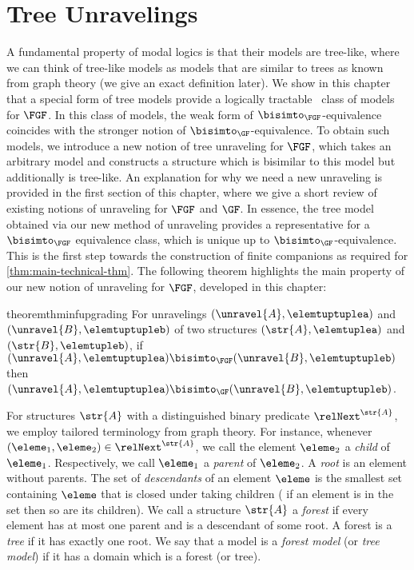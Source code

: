 \chapter{Tree Unravelings}\label{chap:unraveling}
A fundamental property of modal logics is that their models are tree-like, where we can think of tree-like models as models that are similar to trees as known from graph theory (we give an exact definition later).
We show in this chapter that a special form of tree models provide a logically tractable~\cite{otto2013} class of models for $\FGF$.
In this class of models, the weak form of $\bisimto_{\FGF}$-equivalence coincides with the stronger notion of $\bisimto_{\GF}$-equivalence.
To obtain such models, we introduce a new notion of tree unraveling for $\FGF$, which takes an arbitrary model and constructs a structure which is bisimilar to this model but additionally is tree-like.
An explanation for why we need a new unraveling is provided in the first section of this chapter, where we give a short review of existing notions of unraveling for $\FGF$ and $\GF$.
In essence, the tree model obtained via our new method of unraveling provides a representative for a $\bisimto_{\FGF}$ equivalence class, which is unique up to $\bisimto_{\GF}$-equivalence.
This is the first step towards the construction of finite companions as required for \cref{thm:main-technical-thm}.
The following theorem highlights the main property of our new notion of unraveling for $\FGF$, developed in this chapter:
\begin{restatable*}{theorem}{thminfupgrading}\label{thm:inf-bisim-upgrading}
  For unravelings $(\unravel{A}, \elemtuptuplea)$ and $(\unravel{B}, \elemtuptupleb)$  of two structures $(\str{A}, \elemtuplea)$ and $(\str{B}, \elemtupleb)$, if $(\unravel{A}, \elemtuptuplea) \bisimto_{\FGF} (\unravel{B}, \elemtuptupleb)$ then $(\unravel{A}, \elemtuptuplea) \bisimto_{\GF} (\unravel{B}, \elemtuptupleb)$.
\end{restatable*}%

For structures $\str{A}$ with a distinguished binary predicate $\relNext^{\str{A}}$, we employ tailored terminology from graph theory.
For instance, whenever $(\eleme_1, \eleme_2) \in \relNext^{\str{A}}$, we call the element $\eleme_2$ a \emph{child} of $\eleme_1$. Respectively, we call $\eleme_1$ a \emph{parent} of $\eleme_2$.
A \emph{root} is an element without parents.
The set of \emph{descendants} of an element $\eleme$ is the smallest set containing $\eleme$ that is closed under taking children (\ie{} if an element is in the set then so are its children).
We call a structure $\str{A}$ a \emph{forest} if every element has at most one parent and is a descendant of some root.
A forest is a \emph{tree} if it has exactly one root.
We say that a model is a \emph{forest model} (or \emph{tree model}) if it has a domain which is a forest (or tree).

